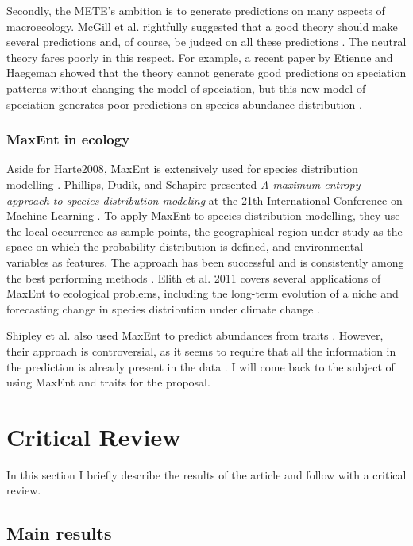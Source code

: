 \documentclass[letterpaper,12pt]{article}
\begin{document}
Secondly, the METE's ambition is to generate predictions on many aspects of
macroecology. McGill et al. rightfully suggested that a good theory should
make several predictions and, of course, be judged on all these predictions
\cite{mcg07}. The neutral theory fares poorly in this respect. For example, a
recent paper by Etienne and Haegeman showed that the theory cannot generate
good predictions on speciation patterns without changing the model of
speciation, but this new model of speciation generates poor predictions on
species abundance distribution \cite{eti11}.

\subsubsection{MaxEnt in ecology}

Aside for Harte2008, MaxEnt is extensively used for species distribution
modelling \cite{fra10}. Phillips, Dudik, and Schapire presented \emph{A
maximum entropy approach to species distribution modeling} at the 21th
International Conference on Machine Learning \cite{phi04}. To apply MaxEnt
to species distribution modelling, they use the local occurrence as sample
points, the geographical region under study as the space on which the
probability distribution is defined, and environmental variables as
features. The approach has been successful and is consistently among the
best performing methods \cite{phi06,eli11}. Elith et al. 2011 \cite{eli11}
covers several applications of MaxEnt to ecological problems, including the
long-term evolution of a niche \cite{ver09} and forecasting change in
species distribution under climate change \cite{yat10}.

Shipley et al. also used MaxEnt to predict abundances from traits \cite
{shi06,shi10}. However, their approach is controversial, as it seems to
require that all the information in the prediction is already present in the
data \cite{hae08,hae09,shi09,har11,pet10}. I will come back to the
subject of using MaxEnt and traits for the proposal.

\newpage
\section{Critical Review}\label{review}

In this section I briefly describe the results of the article and follow
with a critical review.

\subsection{Main results}
\end{document}
